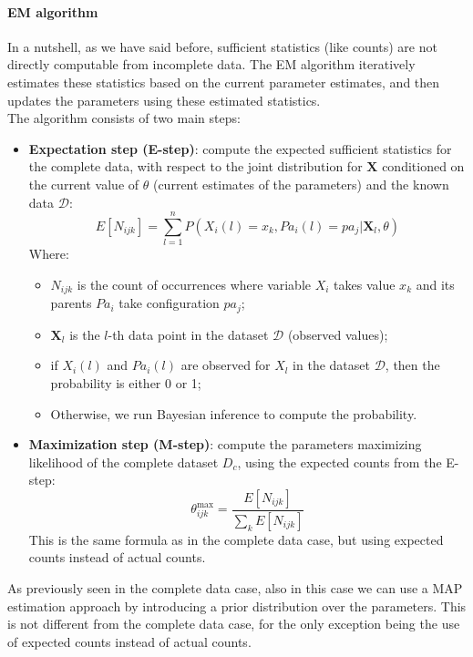 \paragraph{EM algorithm}
In a nutshell, as we have said before, sufficient statistics (like counts) are not directly computable from incomplete data.
The EM algorithm iteratively estimates these statistics based on the current parameter estimates, 
and then updates the parameters using these estimated statistics.
\\The algorithm consists of two main steps:
\begin{itemize}
    \item \textbf{Expectation step (E-step)}: compute the expected sufficient statistics for the complete data,
    with respect to the joint distribution for $\boldsymbol{X}$ conditioned on the current
    value of $\theta$ (current estimates of the parameters) and the known data $\mathcal{D}$:
    \begin{equation}
        E[N_{ijk}] = \sum_{l=1}^{n} P(X_i(l) = x_{k}, Pa_i(l) = pa_{j} | \boldsymbol{X}_l, \theta)
    \end{equation}
    Where:
    \begin{itemize}
        \item $N_{ijk}$ is the count of occurrences where variable $X_i$ takes value $x_k$
        and its parents $Pa_i$ take configuration $pa_j$;
        \item $\boldsymbol{X}_l$ is the $l$-th data point in the dataset $\mathcal{D}$ (observed values);
        \item if $X_i(l)$ and $Pa_i(l)$ are observed for $X_l$ in the dataset $\mathcal{D}$, then the probability is either 0 or 1;
        \item Otherwise, we run Bayesian inference to compute the probability.
    \end{itemize}
    \item \textbf{Maximization step (M-step)}: compute the parameters maximizing likelihood of the
    complete dataset $D_c$, using the expected counts from the E-step:
    \begin{equation}
        \theta_{ijk}^{\max} = \frac{E[N_{ijk}]}{\sum_{k} E[N_{ijk}]}
    \end{equation}
    This is the same formula as in the complete data case, but using expected counts instead of actual counts.
\end{itemize}
As previously seen in the complete data case, also in this case we can use a MAP estimation approach by 
introducing a prior distribution over the parameters. This is not different from the complete data case,
for the only exception being the use of expected counts instead of actual counts.

